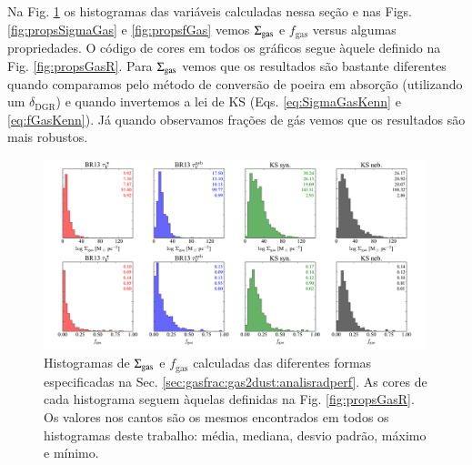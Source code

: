 Na Fig. \ref{fig:histoGas} os histogramas das variáveis calculadas nessa seção e nas Figs.
\ref{fig:propsSigmaGas} e \ref{fig:propsfGas} vemos $\SigmaGas$ e $f_{\mathrm{gas}}$ versus algumas
propriedades. O código de cores em todos os gráficos segue àquele definido na Fig.
\ref{fig:propsGasR}. Para $\SigmaGas$ vemos que os resultados são bastante diferentes quando
comparamos pelo método de conversão de poeira em absorção (utilizando um $\delta_{\mathrm{DGR}}$) e
quando invertemos a lei de KS (Eqs. \ref{eq:SigmaGasKenn} e \ref{eq:fGasKenn}). Já quando observamos
frações de gás vemos que os resultados são mais robustos. 

\begin{figure}
	\centering
	\includegraphics[width=0.99\textwidth]{figuras/histo_gas_R.pdf}
	\caption[Histogramas de $\SigmaGas$ e $f_{\mathrm{gas}}$.]
	{Histogramas de $\SigmaGas$ e $f_{\mathrm{gas}}$ calculadas das diferentes formas especificadas
na Sec. \ref{sec:gasfrac:gas2dust:analisradperf}. As cores de cada histograma seguem àquelas
definidas na Fig. \ref{fig:propsGasR}. Os valores nos cantos são os mesmos encontrados em todos os
histogramas deste trabalho: média, mediana, desvio padrão, máximo e mínimo.}
	\label{fig:histoGas}
\end{figure}

